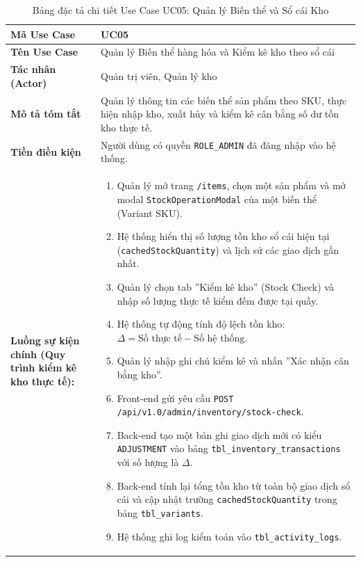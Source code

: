 \begin{table}[htbp]
\centering
\caption{Bảng đặc tả chi tiết Use Case UC05: Quản lý Biến thể và Sổ cái Kho}
\label{tab:uc05_inventory}
\vspace{2mm}
\begin{tabularx}{\textwidth}{|l|X|}
\hline
\textbf{Mã Use Case} & \textbf{UC05} \\ \hline
\textbf{Tên Use Case} & Quản lý Biến thể hàng hóa và Kiểm kê kho theo sổ cái \\ \hline
\textbf{Tác nhân (Actor)} & Quản trị viên, Quản lý kho \\ \hline
\textbf{Mô tả tóm tắt} & Quản lý thông tin các biến thể sản phẩm theo SKU, thực hiện nhập kho, xuất hủy và kiểm kê cân bằng số dư tồn kho thực tế. \\ \hline
\textbf{Tiền điều kiện} & Người dùng có quyền \texttt{ROLE\_ADMIN} đã đăng nhập vào hệ thống. \\ \hline
\textbf{Luồng sự kiện chính (Quy trình kiểm kê kho thực tế):} & 
\begin{enumerate}[leftmargin=*, nosep]
    \item Quản lý mở trang \texttt{/items}, chọn một sản phẩm và mở modal \texttt{StockOperationModal} của một biến thể (Variant SKU).
    \item Hệ thống hiển thị số lượng tồn kho sổ cái hiện tại (\texttt{cachedStockQuantity}) và lịch sử các giao dịch gần nhất.
    \item Quản lý chọn tab ''Kiểm kê kho'' (Stock Check) và nhập số lượng thực tế kiểm đếm được tại quầy.
    \item Hệ thống tự động tính độ lệch tồn kho: $\Delta = \text{Số thực tế} - \text{Số hệ thống}$.
    \item Quản lý nhập ghi chú kiểm kê và nhấn ''Xác nhận cân bằng kho''.
    \item Front-end gửi yêu cầu \texttt{POST /api/v1.0/admin/inventory/stock-check}.
    \item Back-end tạo một bản ghi giao dịch mới có kiểu \texttt{ADJUSTMENT} vào bảng \texttt{tbl\_inventory\_transactions} với số lượng là $\Delta$.
    \item Back-end tính lại tổng tồn kho từ toàn bộ giao dịch sổ cái và cập nhật trường \texttt{cachedStockQuantity} trong bảng \texttt{tbl\_variants}.
    \item Hệ thống ghi log kiểm toán vào \texttt{tbl\_activity\_logs}.

\end{enumerate}
\end{tabularx}
\end{table}
